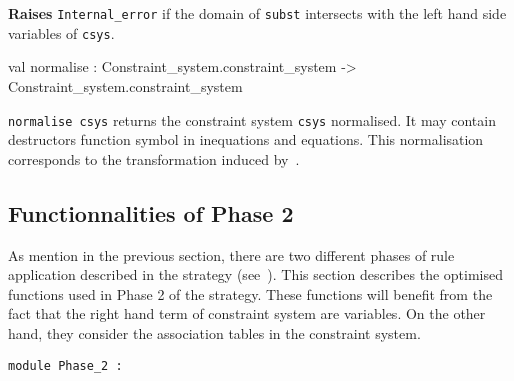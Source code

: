 \begin{ocamldocsigend}
\begin{ocamldocdescription}
{\bf Raises} {\tt{Internal\_error}} if the domain of {\tt{subst}} intersects with the left hand side variables of {\tt{csys}}. \highdebug 


\end{ocamldocdescription}


\label{val:Constraint-underscoresystem.Phase-underscore1.normalise}\begin{ocamldoccode}
val normalise :
  Constraint_system.constraint_system -> Constraint_system.constraint_system
\end{ocamldoccode}
\begin{ocamldocdescription}
{\tt{normalise csys}} returns the constraint system {\tt{csys}} normalised. It may contain destructors function symbol in
      inequations and equations. This normalisation corresponds to the transformation induced by~. 


\end{ocamldocdescription}
\end{ocamldocsigend}






\subsection{Functionnalities of Phase 2}




As mention in the previous section, there are two different phases
    of rule application described in the strategy (see~).  This section describes the 
    optimised functions used in Phase 2 of the strategy.
    These functions will benefit from the fact that the right hand term of constraint system are variables.
    On the other hand, they consider the association tables in the constraint system.



\begin{ocamldoccode}
{\tt{module }}{\tt{Phase\_2}}{\tt{ : }}\end{ocamldoccode}
\label{module:Constraint-underscoresystem.Phase-underscore2}

